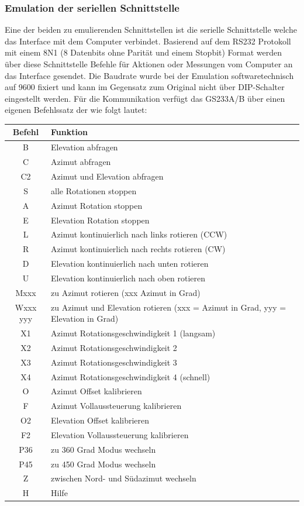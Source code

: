\subsubsection{Emulation der seriellen Schnittstelle}
Eine der beiden zu emulierenden Schnittstellen ist die serielle Schnittstelle welche das Interface mit dem Computer verbindet. Basierend auf dem RS232 Protokoll mit einem 8N1 (8 Datenbits ohne Parität und einem Stopbit) Format werden über diese Schnittstelle Befehle für Aktionen oder Messungen vom Computer an das Interface gesendet. Die Baudrate wurde bei der Emulation softwaretechnisch auf 9600 fixiert und kann im Gegensatz zum Original nicht über DIP-Schalter eingestellt werden. Für die Kommunikation verfügt das GS233A/B über einen eigenen Befehlssatz der wie folgt lautet:

\begin{tabular}{| c | l |}
	\hline
	\textbf{Befehl} & \textbf{Funktion} \\
	\hline
	B & Elevation abfragen \\
	\hline
	C & Azimut abfragen \\
	\hline
	C2 & Azimut und Elevation abfragen \\
	\hline
	S & alle Rotationen stoppen \\
	\hline
	A & Azimut Rotation stoppen \\
	\hline
	E & Elevation Rotation stoppen \\
	\hline
	L & Azimut kontinuierlich nach links rotieren (CCW) \\
	\hline
	R & Azimut kontinuierlich nach rechts rotieren (CW) \\
	\hline 
	D & Elevation kontinuierlich nach unten rotieren \\
	\hline 
	U & Elevation kontinuierlich nach oben rotieren \\
	\hline
	Mxxx & zu Azimut rotieren (xxx Azimut in Grad) \\
	\hline
	Wxxx yyy & zu Azimut und Elevation rotieren (xxx = Azimut in Grad, yyy = Elevation in Grad) \\
	\hline
	X1 & Azimut Rotationsgeschwindigkeit 1 (langsam)\\
	\hline
	X2 & Azimut Rotationsgeschwindigkeit 2 \\
	\hline
	X3 & Azimut Rotationsgeschwindigkeit 3 \\
	\hline
	X4 & Azimut Rotationsgeschwindigkeit 4 (schnell)\\
	\hline
	O & Azimut Offset kalibrieren \\
	\hline 
	F & Azimut Vollaussteuerung kalibrieren \\
	\hline
	O2 & Elevation Offset kalibrieren \\
	\hline
	F2 & Elevation Vollaussteuerung kalibrieren \\
	\hline 
	P36 & zu 360 Grad Modus wechseln \\
	\hline 
	P45 & zu 450 Grad Modus wechseln \\
	\hline 
	Z & zwischen Nord- und Südazimut wechseln \\
	\hline
	H & Hilfe \\
	\hline
\end{tabular}

